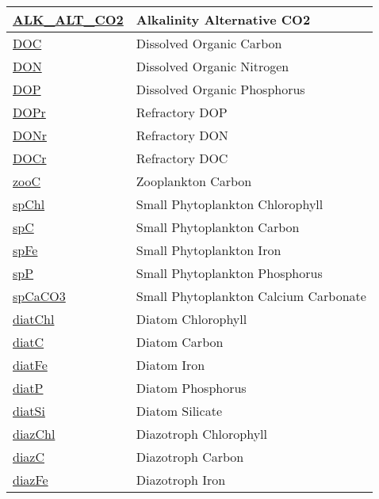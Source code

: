 {\begin{center}
\begin{longtable}{| p{2.0in} | p{4.0in} |}
    \hline
    \hyperref[subsec:var_sec_state_ALK_ALT_CO2]{ALK\_ALT\_CO2} & Alkalinity Alternative CO2 \\
    \hline
    \hyperref[subsec:var_sec_state_DOC]{DOC} & Dissolved Organic Carbon \\
    \hline
    \hyperref[subsec:var_sec_state_DON]{DON} & Dissolved Organic Nitrogen \\
    \hline
    \hyperref[subsec:var_sec_state_DOP]{DOP} & Dissolved Organic Phosphorus \\
    \hline
    \hyperref[subsec:var_sec_state_DOPr]{DOPr} & Refractory DOP \\
    \hline
    \hyperref[subsec:var_sec_state_DONr]{DONr} & Refractory DON \\
    \hline
    \hyperref[subsec:var_sec_state_DOCr]{DOCr} & Refractory DOC \\
    \hline
    \hyperref[subsec:var_sec_state_zooC]{zooC} & Zooplankton Carbon \\
    \hline
    \hyperref[subsec:var_sec_state_spChl]{spChl} & Small Phytoplankton Chlorophyll \\
    \hline
    \hyperref[subsec:var_sec_state_spC]{spC} & Small Phytoplankton Carbon \\
    \hline
    \hyperref[subsec:var_sec_state_spFe]{spFe} & Small Phytoplankton Iron \\
    \hline
    \hyperref[subsec:var_sec_state_spP]{spP} & Small Phytoplankton Phosphorus \\
    \hline
    \hyperref[subsec:var_sec_state_spCaCO3]{spCaCO3} & Small Phytoplankton Calcium Carbonate \\
    \hline
    \hyperref[subsec:var_sec_state_diatChl]{diatChl} & Diatom Chlorophyll \\
    \hline
    \hyperref[subsec:var_sec_state_diatC]{diatC} & Diatom Carbon \\
    \hline
    \hyperref[subsec:var_sec_state_diatFe]{diatFe} & Diatom Iron \\
    \hline
    \hyperref[subsec:var_sec_state_diatP]{diatP} & Diatom Phosphorus \\
    \hline
    \hyperref[subsec:var_sec_state_diatSi]{diatSi} & Diatom Silicate \\
    \hline
    \hyperref[subsec:var_sec_state_diazChl]{diazChl} & Diazotroph Chlorophyll \\
    \hline
    \hyperref[subsec:var_sec_state_diazC]{diazC} & Diazotroph Carbon \\
    \hline
    \hyperref[subsec:var_sec_state_diazFe]{diazFe} & Diazotroph Iron \\

\end{longtable}
\end{center}}
